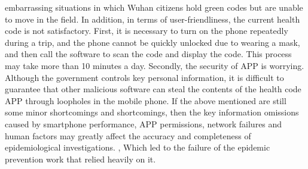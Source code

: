\documentclass[conference]{IEEEtran}
\begin{document}
embarrassing situations in which Wuhan citizens hold green codes but are unable to move in the field. In addition, in terms of user-friendliness, the current health code is not satisfactory. First, it is necessary to turn on the phone repeatedly during a trip, and the phone cannot be quickly unlocked due to wearing a mask, and then call the software to scan the code and display the code. This process may take more than 10 minutes a day. Secondly, the security of APP is worrying. Although the government controls key personal information, it is difficult to guarantee that other malicious software can steal the contents of the health code APP through loopholes in the mobile phone. If the above mentioned are still some minor shortcomings and shortcomings, then the key information omissions caused by smartphone performance, APP permissions, network failures and human factors may greatly affect the accuracy and completeness of epidemiological investigations. , Which led to the failure of the epidemic prevention work that relied heavily on it.
\end{document}
